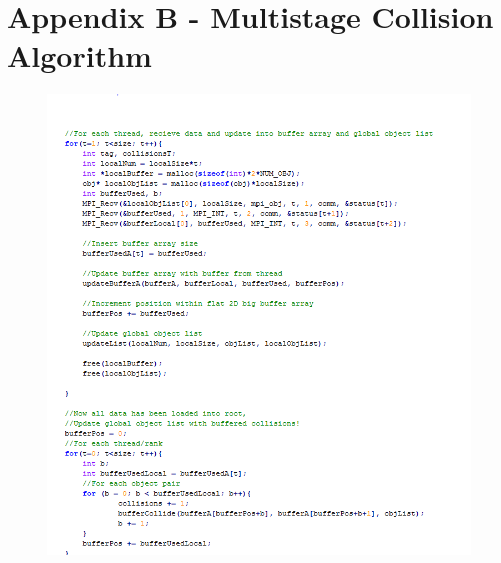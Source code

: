 \documentclass[twoside,twocolumn]{article}
\begin{document}
	\section{Appendix B - Multistage Collision Algorithm}
		\begin{figure}[H]
			\includegraphics[scale=.7]{bufCode.png}
		\end{figure}

	
	
	
\end{document}
